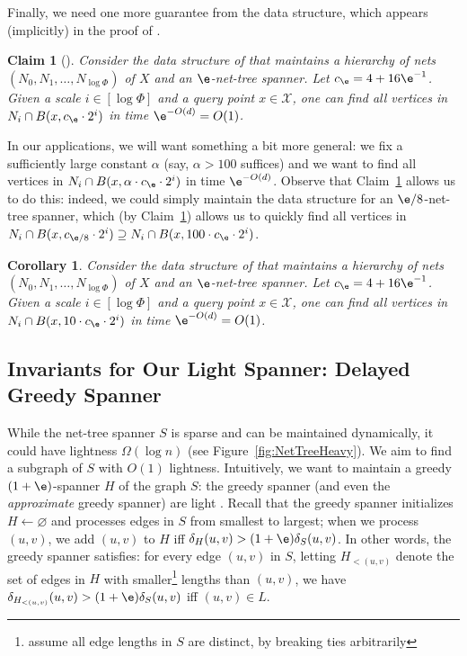 \documentclass[11pt]{article}
\newtheorem{claim}[theorem]{Claim}
\newtheorem{corollary}[theorem]{Corollary}
\newcommand{\dist}{\ensuremath{\delta}}
\newcommand{\ddim}{\ensuremath{d}}
\begin{document}
Finally, we need one more guarantee from the \cite{gao2004deformable} data structure, which appears (implicitly) in the proof of \cite[Theorem 4.2]{gao2004deformable}.
\begin{claim}[\cite{gao2004deformable}]
\label{clm:fast-ball}
    Consider the data structure of \cite{gao2004deformable} that maintains a hierarchy of nets $(N_0, N_1, \ldots, N_{\log \Phi})$ of $X$  and an $\e$-net-tree spanner. Let $c_\e = 4 + 16\e^{-1}$.
    Given a scale $i \in [\log \Phi]$ and a query point $x \in \mathcal X$,  one can find all vertices in $N_i \cap B(x, c_\e \cdot 2^i)$ in time $\e^{-O(\ddim)} = O(1)$.
\end{claim}
In our applications, we will want something a bit more general: we fix a sufficiently large constant $\alpha$ (say, $\alpha > 100$ suffices) and we want to find all vertices in $N_i \cap B(x, \alpha \cdot c_\e \cdot 2^i)$ in time $\e^{-O(\ddim)}$. Observe that Claim~\ref{clm:fast-ball} allows us to do this: indeed, we could simply maintain the data structure for an $\e/8$-net-tree spanner, which (by Claim~\ref{clm:fast-ball}) allows us to quickly find all vertices in $N_i \cap B(x, c_{\e/8} \cdot 2^i) \supseteq N_i \cap B(x, 100 \cdot c_\e \cdot 2^i)$.
\begin{corollary}
\label{cor:expanded-fast-ball}
    Consider the data structure of \cite{gao2004deformable} that maintains a hierarchy of nets $(N_0, N_1, \ldots, N_{\log \Phi})$ of $X$  and an $\e$-net-tree spanner. Let $c_\e = 4 + 16\e^{-1}$.
    Given a scale $i \in [\log \Phi]$ and a query point $x \in \mathcal X$,  one can find all vertices in $N_i \cap B(x, 10 \cdot c_\e \cdot 2^i)$ in time $\e^{-O(\ddim)} = O(1)$.

\end{corollary}



\subsection{Invariants for Our Light Spanner: Delayed Greedy Spanner}
\label{SS:invariants}

While the net-tree spanner $S$ is sparse and can be maintained dynamically, it could have lightness $\Omega(\log n)$ (see Figure~\ref{fig:NetTreeHeavy}).
We aim to find a subgraph of $S$ with $O(1)$ lightness. 
Intuitively, we want to maintain a greedy $(1+\e)$-spanner $H$ of the graph $S$: the greedy spanner (and even the \emph{approximate} greedy spanner) are light \cite{BLW19,FS20}. Recall that the greedy spanner initializes $H \gets \varnothing$ and processes edges in $S$ from smallest to largest; when we process $(u,v)$, we add $(u,v)$ to $H$ iff $\dist_{H}(u,v) > (1+\e) \dist_S(u,v)$. In other words, the greedy spanner satisfies: for every edge $(u,v)$ in $S$, letting $H_{<(u,v)}$
denote the set of edges in $H$ with smaller\footnote{assume all edge lengths in $S$ are distinct, by breaking ties arbitrarily} lengths than $(u,v)$, we have 
$\dist_{H_{<(u,v)}}(u,v) > (1+\e) \dist_S(u,v)$ iff $(u,v) \in L$.
\end{document}
